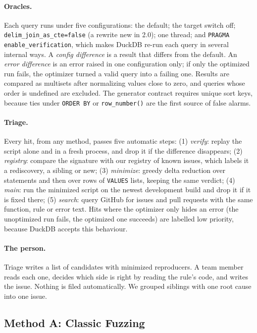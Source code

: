 \paragraph{ Oracles.} Each query runs under five configurations: the default; the target switch off;
\texttt{delim\_join\_as\_cte=false} (a rewrite new in 2.0); one thread; and \texttt{PRAGMA enable\_verification}, which
makes DuckDB re-run each query in several internal ways. A \emph{config difference} is a result that differs from the
default. An \emph{error difference} is an error raised in one configuration only; if only the optimized run fails, the
optimizer turned a valid query into a failing one. Results are compared as multisets after normalizing values close to
zero, and queries whose order is undefined are excluded. The generator contract requires unique sort keys, because ties
under \texttt{ORDER BY} or \texttt{row\_number()} are the first source of false alarms.

\paragraph{ Triage.} Every hit, from any method, passes five automatic steps: (1) \emph{verify}: replay the
script alone and in a fresh process, and drop it if the difference disappears; (2) \emph{registry}: compare the
signature with our registry of known issues, which labels it a rediscovery, a sibling or new; (3) \emph{minimize}:
greedy delta reduction over statements and then over rows of \texttt{VALUES} lists, keeping the same verdict;
(4) \emph{main}: run the minimized script on the newest development build and drop it if it is fixed there; (5)
\emph{search}: query GitHub for issues and pull requests with the same function, rule or error text. Hits where the
optimizer only hides an error (the unoptimized run fails, the optimized one succeeds) are labelled low priority,
because DuckDB accepts this behaviour.

\paragraph{ The person.} Triage writes a list of candidates with minimized reproducers. A team member reads
each one, decides which side is right by reading the rule's code, and writes the issue. Nothing is filed
automatically. We grouped siblings with one root cause into one issue.

\subsection{Method A: Classic Fuzzing}
\label{sec:method-a}

